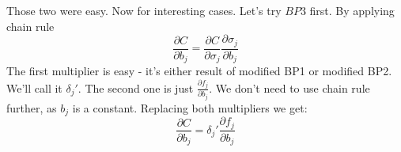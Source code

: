 \documentclass{article}
\begin{document}
Those two were easy. Now for interesting cases. Let's try $BP3$ first. By applying chain rule
$$\frac{\partial C}{\partial b_j} = \frac{\partial C}{\partial \sigma_j} \frac{\partial \sigma_j}{\partial b_j}$$
The first multiplier is easy - it's either result of modified BP1 or modified BP2. We'll call it $\delta_j'$.
The second one is just $\frac{\partial f_j}{\partial b_j}$. We don't need to use chain rule further, as $b_j$ is a constant.
Replacing both multipliers we get:
$$\frac{\partial C}{\partial b_j} = \delta_j' \frac{\partial f_j}{\partial b_j}$$
\end{document}
